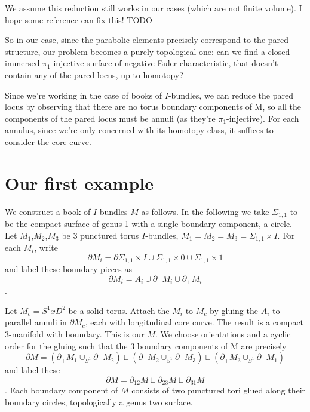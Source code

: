 \documentclass[12pt]{amsart}
\newtheorem{thm}[theorem]{Theorem}
\theoremstyle{definition}
\theoremstyle{remark}
\newcommand{\x}{\times}
\newcommand{\bd}{\partial}
\newcommand{\Si}{\Sigma}
\begin{document}
%
%
%

We assume this reduction still works in our cases (which are not finite
volume). I hope some reference can fix this! TODO

So in our case, since the parabolic elements precisely correspond to the pared
structure, our problem becomes a purely topological one: can we find a closed
immersed $\pi_1$-injective surface of negative Euler characteristic, that
doesn't contain any of the pared locus, up to homotopy?

Since we're working in the case of books of $I$-bundles, we can reduce the
pared locus by observing that there are no torus boundary components of M, so
all the components of the pared locus must be annuli (as they're
$\pi_1$-injective). For each annulus, since we're only concerned with its
homotopy class, it suffices to consider the core curve.

\section{Our first example}

We construct a book of $I$-bundles $M$ as follows. In the following we take
$\Si_{1,1}$ to be the compact surface of genus 1 with a single boundary
component, a circle. Let $M_1$,$M_2$,$M_3$ be 3 punctured torus $I$-bundles,
$M_1=M_2=M_3=\Si_{1,1}\x I$. For each $M_i$, write \[ \bd M_i = \bd \Si_{1,1}\x
I \cup \Si_{1,1}\x0 \cup \Si_{1,1} \x 1 \] and label these boundary pieces as
\[ \bd M_i = A_i \cup \bd_- M_i \cup \bd_+M_i \].

Let $M_c = S^1xD^2$ be a solid torus. Attach the $M_i$ to $M_c$ by gluing the
$A_i$ to parallel annuli in $\bd M_c$, each with longitudinal core curve. The
result is a compact 3-manifold with boundary. This is our $M$. We choose
orientations and a cyclic order for the gluing such that the 3 boundary
components of M are precisely
\[
\bd M = (\bd_+M_1 \cup_{S^1} \bd_-M_2) \sqcup (\bd_+M_2 \cup_{S^1} \bd_-M_3)
\sqcup (\bd_+M_3 \cup_{S^1} \bd_-M_1)
\]
and label these
\[
\bd M=\bd_{12}M \sqcup \bd_{23}M \sqcup \bd_{31}M
\].
Each boundary
component of $M$ consists of two punctured tori glued along their boundary
circles, topologically a genus two surface.
\end{document}
